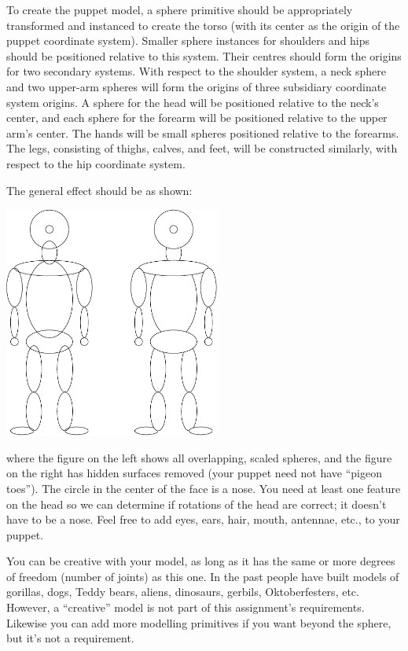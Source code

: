 To create the puppet model,
a sphere primitive should be appropriately transformed and instanced
to create the torso (with its center as the origin of the
puppet coordinate system).
Smaller sphere instances for shoulders and hips should
be positioned relative to this system.
Their centres should form the origins for two secondary systems.
With respect to the shoulder system, a neck sphere and
two upper-arm spheres will form the origins of three subsidiary
coordinate system origins.
A sphere for the head will be positioned relative to the neck's center,
and each sphere for
the forearm will be positioned relative to the upper arm's center.
The hands will be small spheres positioned relative to the forearms.
The legs, consisting of thighs, calves, and feet, will be constructed
similarly, with respect to the hip coordinate system.

The general effect should be as shown:


\begin{center}
\includegraphics[height=3in]{blobby}
\end{center}

\noindent
where the figure on the left shows all overlapping, scaled spheres, and
the figure on the right has hidden surfaces removed (your puppet need
not have ``pigeon toes'').  The circle in the center of the face is a
nose.  You need at least one feature on the head so we can determine 
if rotations of the head are correct; it doesn't have to be a nose.  
Feel free to add eyes, ears, hair, mouth, antennae, etc., to your puppet.   

You can be creative with your model, as long as it has the same or more degrees
of freedom (number of joints) as this one.   In the past people
have built models of gorillas, dogs, Teddy bears, aliens, dinosaurs, 
gerbils, Oktoberfesters, etc.   
However, a ``creative'' model is not part of this assignment's
requirements.   Likewise you can add more modelling primitives
if you want beyond the sphere, but it's not a requirement. 

